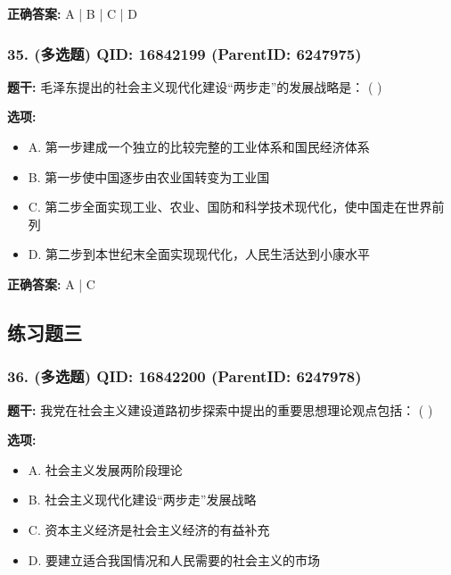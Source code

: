 \documentclass[12pt,UTF8]{ctexart}
\begin{document}
\textbf{正确答案:}
A | B | C | D

\vspace{0.3em}\hrulefill\vspace{0.7em}

\subsubsection*{35. (多选题) \small QID: 16842199 (ParentID: 6247975)}

\textbf{题干:}
毛泽东提出的社会主义现代化建设“两步走”的发展战略是： ( )



\textbf{选项:}
\begin{itemize}[leftmargin=*]

  \item A. 第一步建成一个独立的比较完整的工业体系和国民经济体系

  \item B. 第一步使中国逐步由农业国转变为工业国

  \item C. 第二步全面实现工业、农业、国防和科学技术现代化，使中国走在世界前列

  \item D. 第二步到本世纪末全面实现现代化，人民生活达到小康水平

\end{itemize}

\textbf{正确答案:}
A | C

\vspace{0.3em}\hrulefill\vspace{0.7em}

\subsection*{练习题三}

\subsubsection*{36. (多选题) \small QID: 16842200 (ParentID: 6247978)}

\textbf{题干:}
我党在社会主义建设道路初步探索中提出的重要思想理论观点包括： ( )



\textbf{选项:}
\begin{itemize}[leftmargin=*]

  \item A. 社会主义发展两阶段理论

  \item B. 社会主义现代化建设“两步走”发展战略

  \item C. 资本主义经济是社会主义经济的有益补充

  \item D. 要建立适合我国情况和人民需要的社会主义的市场

\end{itemize}
\end{document}

